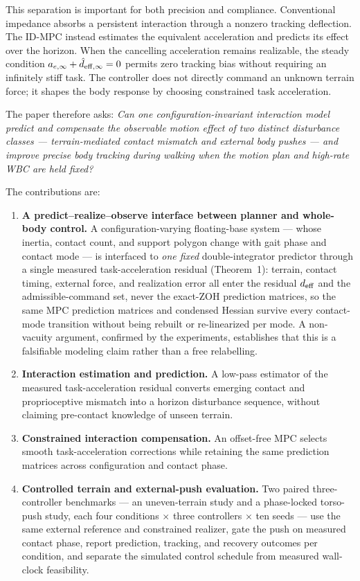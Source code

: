 \documentclass[journal]{IEEEtran}
\theoremstyle{plain}
\theoremstyle{definition}
\theoremstyle{remark}
\newcommand{\deff}{d_{\rm eff}}
\begin{document}
This separation is important for both precision and compliance. Conventional impedance absorbs a persistent interaction through a nonzero tracking deflection. The ID-MPC instead estimates the equivalent acceleration and predicts its effect over the horizon. When the cancelling acceleration remains realizable, the steady condition $a_{e,\infty}+\hat d_{{\rm eff},\infty}=0$ permits zero tracking bias without requiring an infinitely stiff task. The controller does not directly command an unknown terrain force; it shapes the body response by choosing constrained task acceleration.

The paper therefore asks: \emph{Can one configuration-invariant interaction model predict and compensate the observable motion effect of two distinct disturbance classes --- terrain-mediated contact mismatch and external body pushes --- and improve precise body tracking during walking when the motion plan and high-rate WBC are held fixed?}

The contributions are:
\begin{enumerate}
\item \textbf{A predict--realize--observe interface between planner and whole-body control.} A configuration-varying floating-base system --- whose inertia, contact count, and support polygon change with gait phase and contact mode --- is interfaced to \emph{one fixed} double-integrator predictor through a single measured task-acceleration residual (Theorem~1): terrain, contact timing, external force, and realization error all enter the residual $\deff$ and the admissible-command set, never the exact-ZOH prediction matrices, so the same MPC prediction matrices and condensed Hessian survive every contact-mode transition without being rebuilt or re-linearized per mode. A non-vacuity argument, confirmed by the experiments, establishes that this is a falsifiable modeling claim rather than a free relabelling.
\item \textbf{Interaction estimation and prediction.} A low-pass estimator of the measured task-acceleration residual converts emerging contact and proprioceptive mismatch into a horizon disturbance sequence, without claiming pre-contact knowledge of unseen terrain.
\item \textbf{Constrained interaction compensation.} An offset-free MPC selects smooth task-acceleration corrections while retaining the same prediction matrices across configuration and contact phase.
\item \textbf{Controlled terrain and external-push evaluation.} Two paired three-controller benchmarks --- an uneven-terrain study and a phase-locked torso-push study, each four conditions $\times$ three controllers $\times$ ten seeds --- use the same external reference and constrained realizer, gate the push on measured contact phase, report prediction, tracking, and recovery outcomes per condition, and separate the simulated control schedule from measured wall-clock feasibility.
\end{enumerate}
\end{document}
